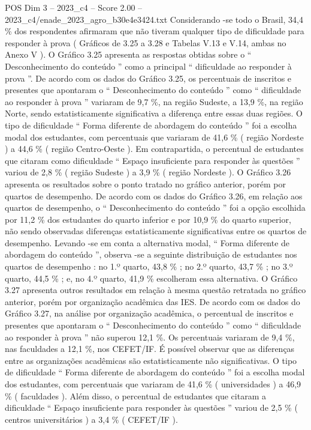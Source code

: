 \begin{textsample}{POS Dim 3 – 2023\_c4 – Score 2.00 – 2023\_c4/enade\_2023\_agro\_b30e4e3424.txt}
Considerando -se todo o Brasil, 34,4 \% dos respondentes afirmaram que não tiveram qualquer tipo de dificuldade para responder à prova ( Gráficos de 3.25 a 3.28 e Tabelas V.13 e V.14, ambas no Anexo V ).
O Gráfico 3.25 apresenta as respostas obtidas sobre o “ Desconhecimento do conteúdo ” como a principal “ dificuldade ao responder à prova ”.
De acordo com os dados do Gráfico 3.25, os percentuais de inscritos e presentes que apontaram o “ Desconhecimento do conteúdo ” como “ dificuldade ao responder à prova ” variaram de 9,7 \%, na região Sudeste, a 13,9 \%, na região Norte, sendo estatisticamente significativa a diferença entre essas duas regiões.
O tipo de dificuldade “ Forma diferente de abordagem do conteúdo ” foi a escolha modal dos estudantes, com percentuais que variaram de 41,6 \% ( região Nordeste ) a 44,6 \% ( região Centro-Oeste ).
Em contrapartida, o percentual de estudantes que citaram como dificuldade “ Espaço insuficiente para responder às questões ” variou de 2,8 \% ( região Sudeste ) a 3,9 \% ( região Nordeste ).
O Gráfico 3.26 apresenta os resultados sobre o ponto tratado no gráfico anterior, porém por quartos de desempenho.
De acordo com os dados do Gráfico 3.26, em relação aos quartos de desempenho, o “ Desconhecimento do conteúdo ” foi a opção escolhida por 11,2 \% dos estudantes do quarto inferior e por 10,9 \% do quarto superior, não sendo observadas diferenças estatisticamente significativas entre os quartos de desempenho.
Levando -se em conta a alternativa modal, “ Forma diferente de abordagem do conteúdo ”, observa -se a seguinte distribuição de estudantes nos quartos de desempenho : no 1.º quarto, 43,8 \% ; no 2.º quarto, 43,7 \% ; no 3.º quarto, 44,5 \% ; e, no 4.º quarto, 41,9 \% escolheram essa alternativa.
O Gráfico 3.27 apresenta outros resultados em relação à mesma questão retratada no gráfico anterior, porém por organização acadêmica das IES.
De acordo com os dados do Gráfico 3.27, na análise por organização acadêmica, o percentual de inscritos e presentes que apontaram o “ Desconhecimento do conteúdo ” como “ dificuldade ao responder à prova ” não superou 12,1 \%.
Os percentuais variaram de 9,4 \%, nas faculdades a 12,1 \%, nos CEFET/IF.
É possível observar que as diferenças entre as organizações acadêmicas são estatisticamente não significativas.
O tipo de dificuldade “ Forma diferente de abordagem do conteúdo ” foi a escolha modal dos estudantes, com percentuais que variaram de 41,6 \% ( universidades ) a 46,9 \% ( faculdades ).
Além disso, o percentual de estudantes que citaram a dificuldade “ Espaço insuficiente para responder às questões ” variou de 2,5 \% ( centros universitários ) a 3,4 \% ( CEFET/IF ).

\end{textsample}
